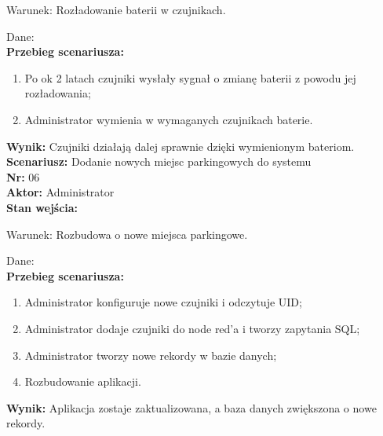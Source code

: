 \documentclass[12pt,a4paper]{article}
\begin{document}
Warunek: Rozładowanie baterii w czujnikach.

Dane:
\\{\bf Przebieg scenariusza:}
\begin{enumerate}
\item Po ok 2 latach czujniki wysłały sygnał o zmianę baterii z powodu jej rozładowania;
\item Administrator wymienia w wymaganych czujnikach baterie.
\end{enumerate}
{\bf Wynik:} Czujniki działają dalej sprawnie dzięki wymienionym bateriom.
\newline\newline
{\large \bf Scenariusz:} Dodanie nowych miejsc parkingowych do systemu
\\{\bf Nr:} 06
\\{\bf Aktor:} Administrator
\\{\bf Stan wejścia:}

Warunek: Rozbudowa o nowe miejsca parkingowe.

Dane:
\\{\bf Przebieg scenariusza:}
\begin{enumerate}
\item Administrator konfiguruje nowe czujniki i odczytuje UID;
\item Administrator dodaje czujniki do node red’a i tworzy zapytania SQL;
\item Administrator tworzy nowe rekordy w bazie danych;
\item Rozbudowanie aplikacji.
\end{enumerate}
{\bf Wynik:} Aplikacja zostaje zaktualizowana, a baza danych zwiększona o nowe rekordy.



\newpage
\end{document}

